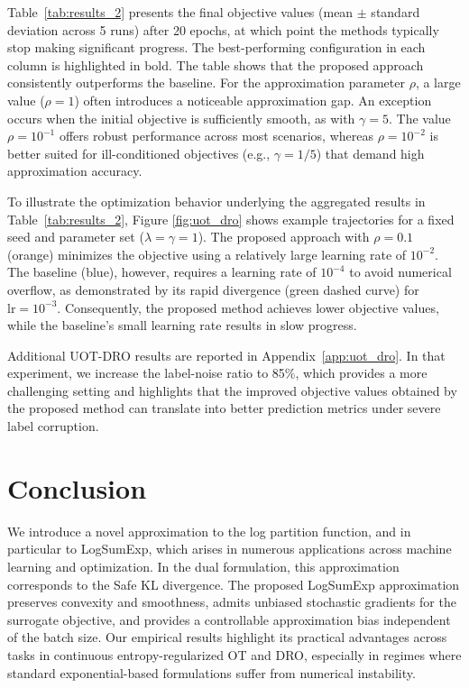 \documentclass{article}
\theoremstyle{plain}
\theoremstyle{definition}
\theoremstyle{remark}
\begin{document}
Table~\ref{tab:results_2} presents the final objective values (mean $\pm$ standard deviation across 5 runs) after 20 epochs, at which point the methods typically stop making significant progress.
The best-performing configuration in each column is highlighted in bold.
The table shows that the proposed approach consistently outperforms the baseline. 
For the approximation parameter $\rho$, a large value ($\rho=1$) often introduces a noticeable approximation gap. An exception occurs when the initial objective is sufficiently smooth, as with $\gamma=5$.
The value $\rho=10^{-1}$ offers robust performance across most scenarios, whereas $\rho=10^{-2}$ is better suited for ill-conditioned objectives (e.g., $\gamma=1/5$) that demand high approximation accuracy.

To illustrate the optimization behavior underlying the aggregated results in Table~\ref{tab:results_2}, Figure \ref{fig:uot_dro} shows example trajectories for a fixed seed and parameter set ($\lambda = \gamma = 1$). The proposed approach with $\rho=0.1$ (orange) minimizes the objective using a relatively large learning rate of $10^{-2}$. The baseline (blue), however, requires a learning rate of $10^{-4}$ to avoid numerical overflow, as demonstrated by its rapid divergence (green dashed curve) for $\text{lr}=10^{-3}$. Consequently, the proposed method achieves lower objective values, while the baseline's small learning rate results in slow progress.


Additional UOT-DRO results are reported in Appendix~\ref{app:uot_dro}. In that experiment, we increase the label-noise ratio to 85\%, which provides a more challenging setting and highlights that the improved objective values obtained by the proposed method can translate into better prediction metrics under severe label corruption.


\section{Conclusion}

We introduce a novel approximation to the log partition function, and in particular to LogSumExp, which arises in numerous applications across machine learning and optimization.
In the dual formulation, this approximation corresponds to the Safe KL divergence.
The proposed LogSumExp approximation preserves convexity and smoothness, admits unbiased stochastic gradients for the surrogate objective, and provides a controllable approximation bias independent of the batch size.
Our empirical results highlight its practical advantages across tasks in continuous entropy-regularized OT and DRO, especially in regimes where standard exponential-based formulations suffer from numerical instability.
\end{document}
